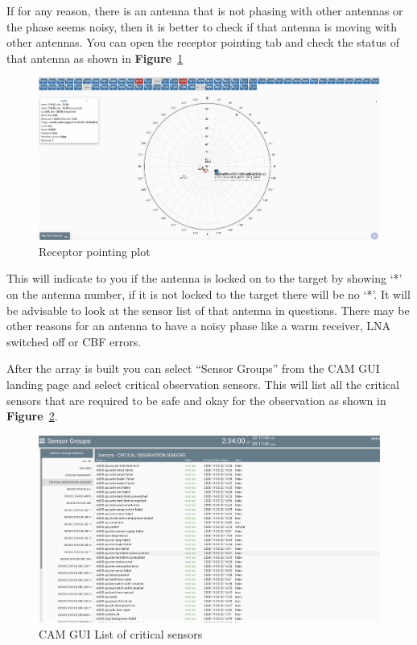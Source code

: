 \begin{itemize}
If for any reason, there is an antenna that is not phasing with other antennas or the phase seems noisy, then it is better to check if that antenna is moving with other antennas. You can open the receptor pointing tab and check the status of that antenna as shown in \textbf{Figure}~\ref{fig:image76} 


\begin{figure}[H]
	\centering
	\includegraphics[scale=0.2]{Chapters/images/image76.png}
	
	\caption{Receptor pointing plot}
	\label{fig:image76}
\end{figure}


This will indicate to you if the antenna is locked on to the target by showing ‘*’ on the antenna number, if it is not locked to the target there will be no ‘*’. It will be advisable to look at the sensor list of that antenna in questions. 
There may be other reasons for an antenna to have a noisy phase like a warm receiver, LNA switched off or CBF errors. 

After the array is built  you can select “Sensor Groups” from the CAM GUI landing page and select critical observation sensors. This will list all the critical sensors that are required to be safe and okay for the observation as shown in \textbf{Figure}~\ref{fig:image125}.  

\end{itemize}

\begin{figure}[H]
	\centering
	\includegraphics[scale=0.2]{Chapters/images/image125.png}
	
	\caption{CAM GUI List of critical sensors}
	\label{fig:image125}
\end{figure}


